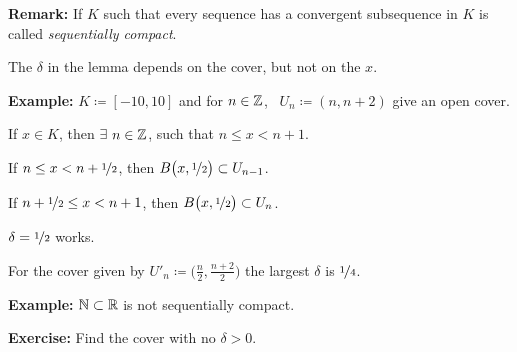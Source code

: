 \documentclass[10pt,aspectratio=149]{beamer}
\begin{document}
\begin{frame}

\textbf{Remark:} If $K$ such that every sequence has a convergent subsequence in
$K$ is called \emph{sequentially compact}.

\pause
\medskip

The $\delta$ in the lemma depends on the cover, but not on the $x$.

\pause
\medskip

\textbf{Example:} $K \coloneqq [-10,10]$ and for $n \in {\mathbb{Z}}$,~
$U_n \coloneqq (n,n+2)$ give an open cover.

\pause
If $x \in K$, then $\exists$ $n \in {\mathbb{Z}}$, such that $n \leq x < n+1$.

\pause
If $n \leq x < n+\nicefrac{1}{2}$, then
$B\bigl(x,\nicefrac{1}{2}\bigr) \subset U_{n-1}$.

\pause
If $n+ \nicefrac{1}{2} \leq x < n+1$, then
$B\bigl(x,\nicefrac{1}{2}\bigr) \subset U_{n}$.

\pause
\thus \quad $\delta = \nicefrac{1}{2}$ works.

\pause
\medskip

For the cover given by
$U'_n \coloneqq \bigl(\frac{n}{2},\frac{n+2}{2} \bigr)$
the largest $\delta$ is
$\nicefrac{1}{4}$.

\pause
\medskip

\textbf{Example:}
${\mathbb{N}} \subset {\mathbb{R}}$ is not sequentially compact.

\pause
\textbf{Exercise:} Find the cover with no $\delta > 0$.

\end{frame}
\end{document}
